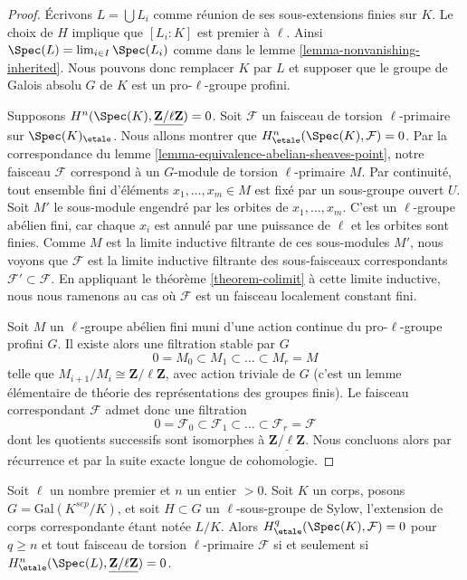\begin{proof}
\'Ecrivons $L = \bigcup L_i$ comme r\'eunion de ses sous-extensions finies sur $K$.
Le choix de $H$ implique que $[L_i : K]$ est premier \`a $\ell$.
Ainsi $\Spec(L) = \lim_{i \in I} \Spec(L_i)$ comme dans le
lemme \ref{lemma-nonvanishing-inherited}.
Nous pouvons donc remplacer $K$ par $L$ et supposer que
le groupe de Galois absolu $G$ de $K$ est un
pro-$\ell$-groupe profini.

\medskip\noindent
Supposons $H^n(\Spec(K), \underline{\mathbf{Z}/\ell\mathbf{Z}}) = 0$.
Soit $\mathcal{F}$ un faisceau de torsion $\ell$-primaire sur $\Spec(K)_\etale$.
Nous allons montrer que $H^n_\etale(\Spec(K), \mathcal{F}) = 0$.
Par la correspondance du
lemme \ref{lemma-equivalence-abelian-sheaves-point},
notre faisceau $\mathcal{F}$ correspond \`a un $G$-module de torsion
$\ell$-primaire $M$. Par continuit\'e, tout ensemble fini d'\'el\'ements $x_1, \ldots, x_m \in M$
est fix\'e par un sous-groupe ouvert $U$.
Soit $M'$ le sous-module engendr\'e par les orbites de $x_1, \ldots, x_m$.
C'est un $\ell$-groupe ab\'elien fini,
car chaque $x_i$ est annul\'e par une puissance de $\ell$
et les orbites sont finies. Comme $M$ est la limite inductive filtrante de
ces sous-modules $M'$, nous voyons que $\mathcal{F}$ est la limite
inductive filtrante des sous-faisceaux correspondants $\mathcal{F}' \subset \mathcal{F}$.
En appliquant le th\'eor\`eme \ref{theorem-colimit} \`a cette limite inductive, nous nous ramenons
au cas o\`u $\mathcal{F}$ est un faisceau localement constant fini.

\medskip\noindent
Soit $M$ un $\ell$-groupe ab\'elien fini muni d'une action continue
du pro-$\ell$-groupe profini $G$. Il existe alors une filtration
stable par $G$
$$
0 = M_0 \subset M_1 \subset \ldots \subset M_r = M
$$
telle que $M_{i + 1}/M_i \cong \mathbf{Z}/\ell \mathbf{Z}$, avec
action triviale de $G$ (c'est un lemme \'el\'ementaire de th\'eorie des repr\'esentations
des groupes finis).
Le faisceau correspondant $\mathcal{F}$ admet donc une filtration
$$
0 = \mathcal{F}_0 \subset \mathcal{F}_1 \subset \ldots \subset
\mathcal{F}_r = \mathcal{F}
$$
dont les quotients successifs sont isomorphes \`a
$\underline{\mathbf{Z}/\ell \mathbf{Z}}$.
Nous concluons alors par r\'ecurrence et par la suite exacte longue de
cohomologie.
\end{proof}

\begin{lemma}
\label{lemma-reduce-to-l-group-higher}
Soit $\ell$ un nombre premier et $n$ un entier $> 0$.
Soit $K$ un corps, posons $G = \text{Gal}(K^{sep}/K)$, et soit
$H \subset G$ un $\ell$-sous-groupe de Sylow,
l'extension de corps correspondante \'etant not\'ee $L/K$.
Alors $H^q_\etale(\Spec(K),\mathcal{F}) = 0$ pour $q \geq n$ et tout
faisceau de torsion $\ell$-primaire $\mathcal{F}$ si et seulement si
$H^n_\etale(\Spec(L), \underline{\mathbf{Z}/\ell\mathbf{Z}}) = 0$.
\end{lemma}

